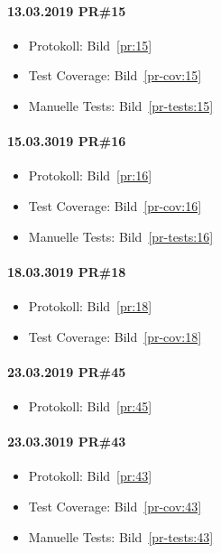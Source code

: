 \documentclass[accentcolor=tud0b,12pt,paper=a4]{tudreport}
\begin{document}
\paragraph{13.03.2019 PR\#15}
\begin{itemize}
\item Protokoll: Bild~\ref{pr:15}
\item Test Coverage: Bild~\ref{pr-cov:15}
\item Manuelle Tests: Bild~\ref{pr-tests:15}
\end{itemize}

\paragraph{15.03.3019 PR\#16}
\begin{itemize}
\item Protokoll: Bild~\ref{pr:16}
\item Test Coverage: Bild~\ref{pr-cov:16}
\item Manuelle Tests: Bild~\ref{pr-tests:16}
\end{itemize}

\paragraph{18.03.3019 PR\#18}
\begin{itemize}
\item Protokoll: Bild~\ref{pr:18}
\item Test Coverage: Bild~\ref{pr-cov:18}
\end{itemize}

\paragraph{23.03.2019 PR\#45}
\begin{itemize}
\item Protokoll: Bild~\ref{pr:45}
\end{itemize}

\paragraph{23.03.3019 PR\#43}
\begin{itemize}
\item Protokoll: Bild~\ref{pr:43}
\item Test Coverage: Bild~\ref{pr-cov:43}
\item Manuelle Tests: Bild~\ref{pr-tests:43}
\end{itemize}
\end{document}
